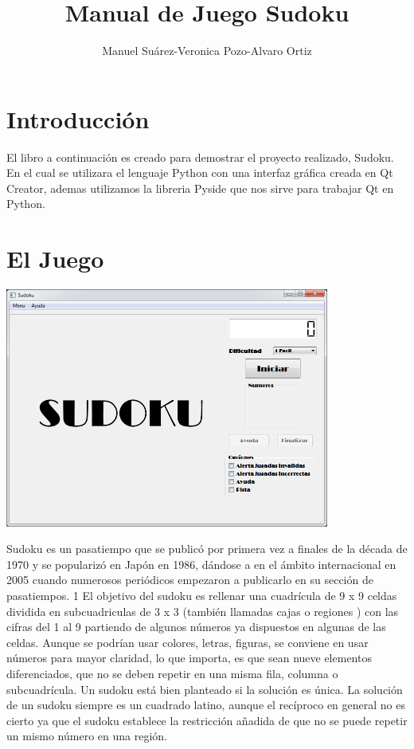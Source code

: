 \documentclass[12pt,oneside]{book}
\title{Manual de Juego Sudoku}
\author{Manuel Suárez-Veronica Pozo-Alvaro Ortiz}
\begin{document}
\maketitle
\tableofcontents

\chapter{Introducción}

El libro a continuación es creado para demostrar el proyecto realizado, Sudoku. 
En el cual se utilizara el lenguaje Python con una interfaz gráfica creada en Qt Creator, ademas utilizamos la libreria Pyside que nos
sirve para trabajar Qt en Python. 

\chapter{El Juego}
\begin{center}
	\includegraphics[width=0.8\textwidth]{./imagenes/PantallaPrincipal.png}

	Sudoku es un pasatiempo que se publicó por primera vez a finales de la década de 1970 y se popularizó en Japón en 1986, dándose a 	en el ámbito internacional en 2005 cuando numerosos periódicos empezaron a publicarlo en su sección de pasatiempos. 1 El objetivo del sudoku es rellenar una cuadrícula de 9 x 9 celdas dividida en subcuadriculas de 3 x 3 (también llamadas  cajas o regiones ) con las cifras del 1 al 9 partiendo de algunos números ya dispuestos en algunas de las celdas. 
	Aunque se podrían usar colores, letras, figuras, se conviene en usar números para mayor claridad, lo que importa, es que sean nueve elementos diferenciados, que no se deben repetir en una misma fila,
	columna o subcuadrícula. Un sudoku está bien planteado si la solución es única. La solución de un sudoku siempre es un cuadrado latino, aunque el recíproco
	en general no es cierto ya que el sudoku establece la restricción añadida de que no se puede repetir un mismo número en una región.
\end{center}
\end{document}
